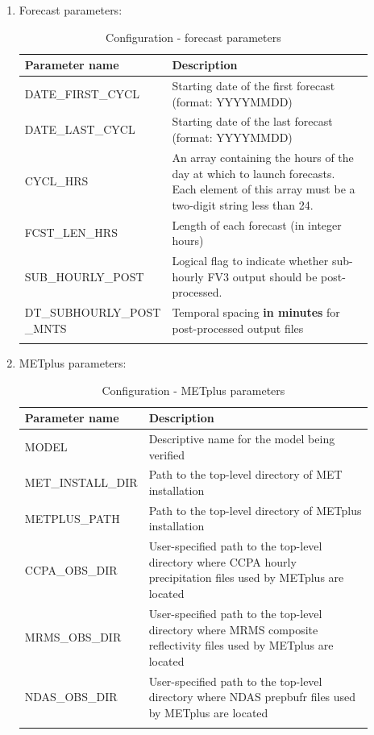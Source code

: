 \documentclass[11pt,fleqn]{report}              %
\begin{document}
\begin{enumerate}
\item Forecast parameters: 
{
\scriptsize
\begin{longtable}{ p{0.21\linewidth} | p{0.69\linewidth} }
\hline
\hline
Parameter name & Description \\
\hline
DATE\_FIRST\_CYCL & Starting date of the first forecast (format: YYYYMMDD) \\
DATE\_LAST\_CYCL & Starting date of the last forecast (format: YYYYMMDD) \\
CYCL\_HRS & An array containing the hours of the day at which to launch forecasts. Each element of this array must be a two-digit string less than 24. \\
FCST\_LEN\_HRS & Length of each forecast (in integer hours) \\
SUB\_HOURLY\_POST & Logical flag to indicate whether sub-hourly FV3 output should be post-processed. \\
DT\_SUBHOURLY\_POST \_MNTS & Temporal spacing {\bf in minutes} for post-processed output files \\
\hline
\caption{Configuration - forecast parameters}
\label{table:config_forecast_parm}
\end{longtable}
}

\item METplus parameters:
{
\scriptsize
\begin{longtable}{ p{0.21\linewidth} | p{0.69\linewidth} }
\hline
\hline
Parameter name & Description \\
\hline
MODEL & Descriptive name for the model being verified \\
MET\_INSTALL\_DIR & Path to the top-level directory of MET installation \\
METPLUS\_PATH & Path to the top-level directory of METplus installation \\
CCPA\_OBS\_DIR & User-specified path to the top-level directory where CCPA hourly precipitation files used by METplus are located \\
MRMS\_OBS\_DIR & User-specified path to the top-level directory where MRMS composite reflectivity files used by METplus are located \\
NDAS\_OBS\_DIR & User-specified path to the top-level directory where NDAS prepbufr files used by METplus are located \\
\hline
\caption{Configuration - METplus parameters}
\label{table:config_metplus}
\end{longtable}
}



\end{enumerate}
\end{document}

